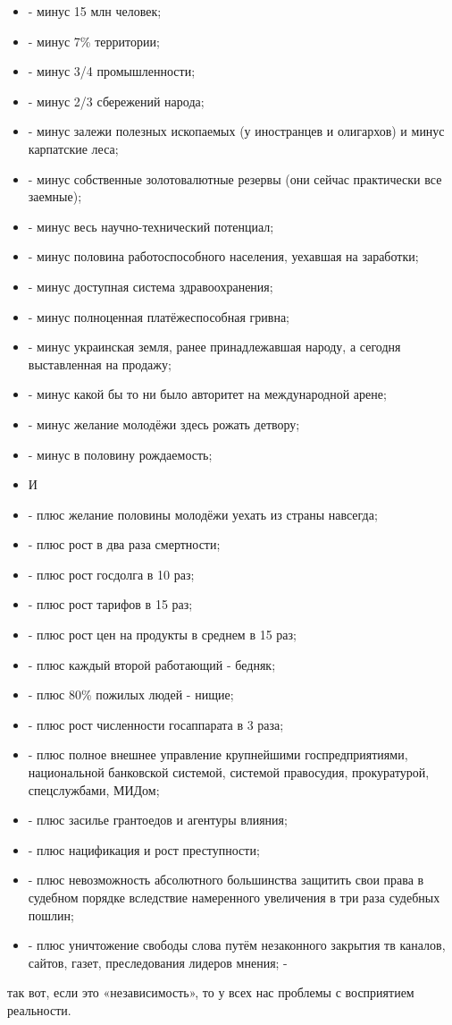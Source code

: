 \begin{itemize}
  \item - минус 15 млн человек;
  \item - минус 7\% территории;
  \item - минус 3/4 промышленности;
  \item - минус 2/3 сбережений народа;
  \item - минус залежи полезных ископаемых (у иностранцев и олигархов) и минус карпатские леса;
  \item - минус собственные золотовалютные резервы (они сейчас практически все заемные);
  \item - минус весь научно-технический потенциал;
  \item - минус половина работоспособного населения, уехавшая на заработки;
  \item - минус доступная система здравоохранения;
  \item - минус полноценная платёжеспособная гривна;
  \item - минус украинская земля, ранее принадлежавшая народу, а сегодня выставленная на продажу; 
  \item - минус какой бы то ни было авторитет на международной арене;
  \item - минус желание молодёжи здесь рожать детвору;
  \item - минус в половину рождаемость;
  \item И
  \item - плюс желание половины молодёжи уехать из страны навсегда; 
  \item - плюс рост в два раза смертности;
  \item - плюс рост госдолга в 10 раз;
  \item - плюс рост тарифов в 15 раз;
  \item - плюс рост цен на продукты в среднем в 15 раз;
  \item - плюс каждый второй работающий - бедняк;
  \item - плюс 80\% пожилых людей - нищие;
  \item - плюс рост численности госаппарата в 3 раза;
  \item - плюс полное внешнее управление крупнейшими госпредприятиями, национальной банковской системой, системой правосудия, прокуратурой, спецслужбами, МИДом;
  \item - плюс засилье грантоедов и агентуры влияния;
  \item - плюс нацификация и рост преступности;
  \item - плюс невозможность абсолютного большинства защитить свои права в судебном порядке вследствие намеренного увеличения в три раза судебных пошлин; 
  \item - плюс уничтожение свободы слова путём незаконного закрытия тв каналов, сайтов, газет, преследования лидеров мнения; -
\end{itemize}

так вот, если это «независимость», то у всех нас проблемы с восприятием реальности.
